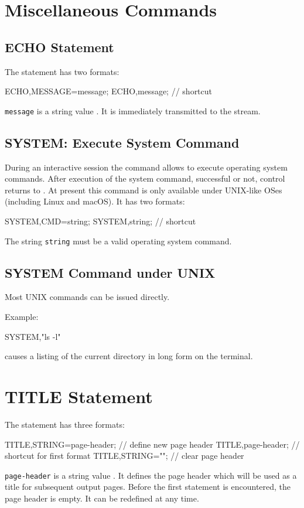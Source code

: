 \section{Miscellaneous Commands}

\subsection{ECHO Statement}
\label{sec:echo}
The  statement has two formats:
\begin{example}
ECHO,MESSAGE=message;
ECHO,message;           // shortcut
\end{example}
\texttt{message} is a string value .
It is immediately transmitted to the  stream.

\subsection{SYSTEM: Execute System Command}
\label{sec:system}
During an interactive \opal session the command 
allows to execute operating system commands.
After execution of the system command, successful or not,
control returns to \opal.
At present this command is only available under UNIX-like OSes (including Linux and macOS).
It has two formats:
\begin{example}
SYSTEM,CMD=string;
SYSTEM,string;         // shortcut
\end{example}
The string  \texttt{string} must be a valid operating
system command.

\subsection{SYSTEM Command under UNIX}
Most UNIX commands can be issued directly.

\noindent Example:
\begin{example}
SYSTEM,"ls -l"
\end{example}
causes a listing of the current directory in long form on the terminal.

\section{TITLE Statement}
\label{sec:title}
The  statement has three formats:
\begin{example}
TITLE,STRING=page-header;   // define new page header
TITLE,page-header;          // shortcut for first format
TITLE,STRING="";            // clear page header
\end{example}
\texttt{page-header} is a string value .
It defines the page header which will be used as a title for
subsequent output pages.
Before the first  statement is encountered,
the page header is empty.
It can be redefined at any time.

